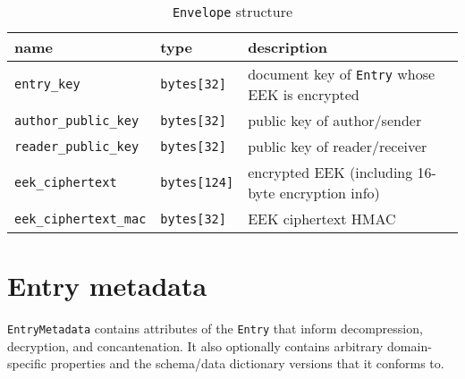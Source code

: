 \documentclass[10pt]{article}
\newcommand{\ttt}[1]{\texttt{#1}}
\def\Entry{\ttt{Entry}}
\def\Envelope{\ttt{Envelope}}
\begin{document}
\begin{appendices}
\begin{table}[htbp]
	\caption*{\Envelope{} structure}
	\begin{small}
	\begin{tabular}{lll}
		\toprule
		name & type  & description \\ \midrule
		\ttt{entry\_key} & \ttt{bytes[32]} & document key of \Entry{} whose EEK is encrypted \\
		\ttt{author\_public\_key} & \ttt{bytes[32]} & public key of author/sender \\
		\ttt{reader\_public\_key} & \ttt{bytes[32]} & public key of reader/receiver \\
		\ttt{eek\_ciphertext}  & \ttt{bytes[124]} & encrypted EEK (including 16-byte encryption info) \\
		\ttt{eek\_ciphertext\_mac} & \ttt{bytes[32]} & EEK ciphertext HMAC \\
		\bottomrule
	\end{tabular}
	\end{small}
\end{table}

\section{Entry metadata}
\label{app:entry-meta}

\ttt{EntryMetadata} contains attributes of the \Entry{} that inform decompression, decryption, and concantenation. It also optionally contains arbitrary domain-specific properties and the schema/data dictionary versions that it conforms to.


\end{appendices}
\end{document}
